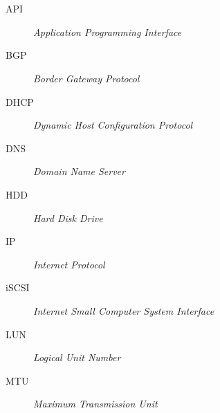\chapter*{\nomeglosarioacronimos}
\label{chap:acronimos}


\begin{description}
 \item [API] \emph{Application Programming Interface}
 \item [BGP] \emph{Border Gateway Protocol}
 \item [DHCP] \emph{Dynamic Host Configuration Protocol}
 \item [DNS] \emph{Domain Name Server}
 \item [HDD] \emph{Hard Disk Drive}
 \item [IP] \emph{Internet Protocol}
 \item [iSCSI] \emph{Internet Small Computer System Interface}
 \item [LUN] \emph{Logical Unit Number}
 \item [MTU] \emph{Maximum Transmission Unit}

\end{description}
